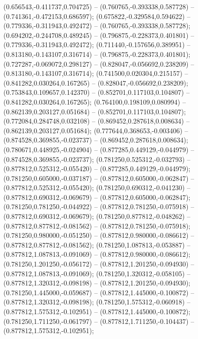  (0.656543,-0.411737,0.704725) -- (0.760765,-0.393338,0.587728) -- (0.741361,-0.472153,0.686597);
 (0.675822,-0.329584,0.594622) -- (0.779336,-0.311943,0.492472) -- (0.760765,-0.393338,0.587728);
 (0.694202,-0.244708,0.489245) -- (0.796875,-0.228373,0.401801) -- (0.779336,-0.311943,0.492472);
 (0.711440,-0.157656,0.389951) -- (0.813180,-0.143107,0.316714) -- (0.796875,-0.228373,0.401801);
 (0.727287,-0.069072,0.298127) -- (0.828047,-0.056692,0.238209) -- (0.813180,-0.143107,0.316714);
 (0.741500,0.020304,0.215157) -- (0.841282,0.030264,0.167265) -- (0.828047,-0.056692,0.238209);
 (0.753843,0.109657,0.142370) -- (0.852701,0.117103,0.104807) -- (0.841282,0.030264,0.167265);
 (0.764100,0.198109,0.080994) -- (0.862139,0.203127,0.051684) -- (0.852701,0.117103,0.104807);
 (0.772084,0.284748,0.032108) -- (0.869452,0.287618,0.008634) -- (0.862139,0.203127,0.051684);
 (0.777644,0.368653,-0.003406) -- (0.874528,0.369855,-0.023737) -- (0.869452,0.287618,0.008634);
 (0.780671,0.448925,-0.024904) -- (0.877285,0.449129,-0.044979) -- (0.874528,0.369855,-0.023737);
 (0.781250,0.525312,-0.032793) -- (0.877812,0.525312,-0.055420) -- (0.877285,0.449129,-0.044979);
 (0.781250,0.605000,-0.037187) -- (0.877812,0.605000,-0.062847) -- (0.877812,0.525312,-0.055420);
 (0.781250,0.690312,-0.041230) -- (0.877812,0.690312,-0.069679) -- (0.877812,0.605000,-0.062847);
 (0.781250,0.781250,-0.044922) -- (0.877812,0.781250,-0.075918) -- (0.877812,0.690312,-0.069679);
 (0.781250,0.877812,-0.048262) -- (0.877812,0.877812,-0.081562) -- (0.877812,0.781250,-0.075918);
 (0.781250,0.980000,-0.051250) -- (0.877812,0.980000,-0.086612) -- (0.877812,0.877812,-0.081562);
 (0.781250,1.087813,-0.053887) -- (0.877812,1.087813,-0.091069) -- (0.877812,0.980000,-0.086612);
 (0.781250,1.201250,-0.056172) -- (0.877812,1.201250,-0.094930) -- (0.877812,1.087813,-0.091069);
 (0.781250,1.320312,-0.058105) -- (0.877812,1.320312,-0.098198) -- (0.877812,1.201250,-0.094930);
 (0.781250,1.445000,-0.059687) -- (0.877812,1.445000,-0.100872) -- (0.877812,1.320312,-0.098198);
 (0.781250,1.575312,-0.060918) -- (0.877812,1.575312,-0.102951) -- (0.877812,1.445000,-0.100872);
 (0.781250,1.711250,-0.061797) -- (0.877812,1.711250,-0.104437) -- (0.877812,1.575312,-0.102951);
